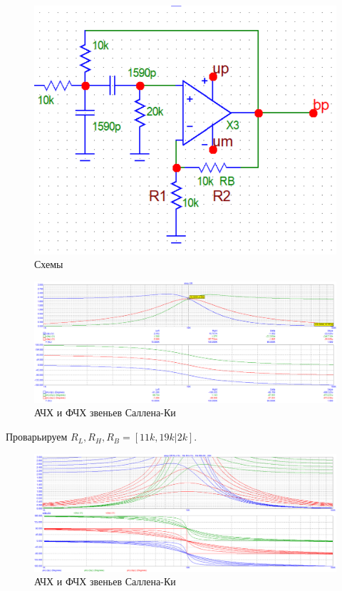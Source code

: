 \documentclass[12pt,a4paper]{article}
\begin{document}
\begin{figure}[H]
\begin{minipage}[b]{0.33\textwidth}
			\includegraphics[width=1\linewidth]{res/skey_scheme_bp.png}
		\end{minipage}
		\caption{Схемы}
	\end{figure}
	
	\begin{figure}[H]
		\centering
		\includegraphics[width=1.0\linewidth]{res/skey.png}
		\caption{АЧХ и ФЧХ звеньев Саллена-Ки}
		\label{scheme}
	\end{figure}
	
	Проварьируем $R_L, R_H, R_B = [11k, 19k | 2k]$.
	\begin{figure}[H]
		\centering
		\includegraphics[width=1.0\linewidth]{res/skey_11_19.png}
		\caption{АЧХ и ФЧХ звеньев Саллена-Ки}
		\label{scheme}
	\end{figure}
\end{document}
